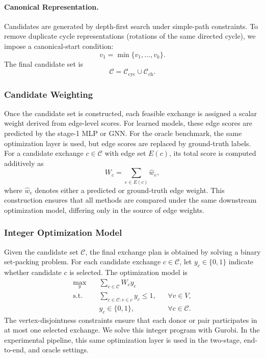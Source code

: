 \documentclass{article}
\begin{document}
\paragraph{Canonical Representation.}
Candidates are generated by depth-first search under simple-path constraints. To remove duplicate cycle representations (rotations of the same directed cycle), we impose a canonical-start condition:
\[
v_1=\min\{v_1,\dots,v_k\}.
\]
The final candidate set is
\[
\mathcal{C}=\mathcal{C}_{\mathrm{cyc}}\cup\mathcal{C}_{\mathrm{ch}}.
\]

\subsubsection{Candidate Weighting}
Once the candidate set is constructed, each feasible exchange is assigned a scalar weight derived from edge-level scores. For learned models, these edge scores are predicted by the stage-1 MLP or GNN. For the oracle benchmark, the same optimization layer is used, but edge scores are replaced by ground-truth labels. For a candidate exchange \(c\in\mathcal{C}\) with edge set \(E(c)\), its total score is computed additively as
\[
W_c = \sum_{e\in E(c)} \hat w_e,
\]
where \(\hat w_e\) denotes either a predicted or ground-truth edge weight. This construction ensures that all methods are compared under the same downstream optimization model, differing only in the source of edge weights.

\subsubsection{Integer Optimization Model}
Given the candidate set \(\mathcal{C}\), the final exchange plan is obtained by solving a binary set-packing problem. For each candidate exchange \(c\in\mathcal{C}\), let \(y_c\in\{0,1\}\) indicate whether candidate \(c\) is selected. The optimization model is
\begin{align}
    \max_{y} \quad & \sum_{c\in\mathcal{C}} W_c y_c \\
    \text{s.t.} \quad & \sum_{c\in\mathcal{C}: v\in c} y_c \le 1, && \forall v\in V, \\
    & y_c \in \{0,1\}, && \forall c\in\mathcal{C}.
\end{align}
The vertex-disjointness constraints ensure that each donor or pair participates in at most one selected exchange. We solve this integer program with Gurobi. In the experimental pipeline, this same optimization layer is used in the two-stage, end-to-end, and oracle settings.
\end{document}
